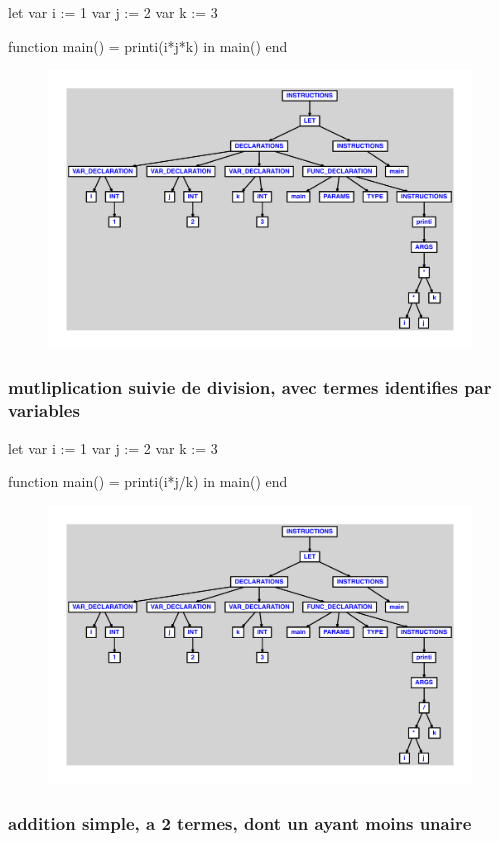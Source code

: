 \documentclass{article}
\begin{document}
\begin{verbatimtab}
let
	var i := 1
	var j := 2
	var k := 3

	function main() = printi(i*j*k)
in main() end
\end{verbatimtab}
\begin{figure}[H]\centering\includegraphics[max width=\textwidth]{ast/ast_61.pdf}\end{figure}\subsubsection{mutliplication suivie de division, avec termes identifies par variables}
\begin{verbatimtab}
let
	var i := 1
	var j := 2
	var k := 3

	function main() = printi(i*j/k)
in main() end
\end{verbatimtab}
\begin{figure}[H]\centering\includegraphics[max width=\textwidth]{ast/ast_62.pdf}\end{figure}\subsubsection{addition simple, a 2 termes, dont un ayant moins unaire}
\end{document}
